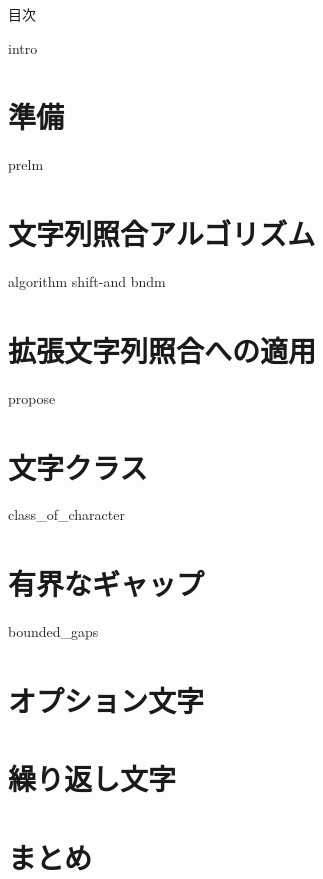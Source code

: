 \documentclass[12pt, dvipdfmx]{beamer}
\begin{document}
\maketitle
\begin{frame}{目次}
	\tableofcontents
\end{frame}

{intro}
\section{準備}
{prelm}
\section{文字列照合アルゴリズム}
{algorithm}
{shift-and}
{bndm}
\section{拡張文字列照合への適用}
{propose}
\section{文字クラス}
{class_of_character}
\section{有界なギャップ}
{bounded_gaps}
\section{オプション文字}
\section{繰り返し文字}
\section{まとめ}
\end{document}
